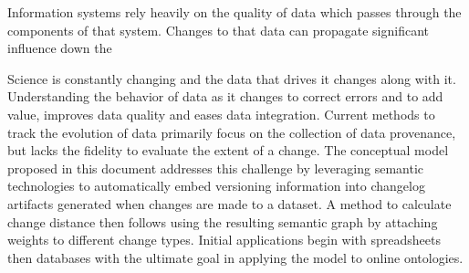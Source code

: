 

Information systems rely heavily on the quality of data which passes through the components of that system.
Changes to that data can propagate significant influence down the 

Science is constantly changing and the data that drives it changes along with it.
Understanding the behavior of data as it changes to correct errors and to add value, improves data quality and eases data integration.
Current methods to track the evolution of data primarily focus on the collection of data provenance, but lacks the fidelity to evaluate the extent of a change.
The conceptual model proposed in this document addresses this challenge by leveraging semantic technologies to automatically embed versioning information into changelog artifacts generated when changes are made to a dataset.
A method to calculate change distance then follows using the resulting semantic graph by attaching weights to different change types.
Initial applications begin with spreadsheets then databases with the ultimate goal in applying the model to online ontologies.